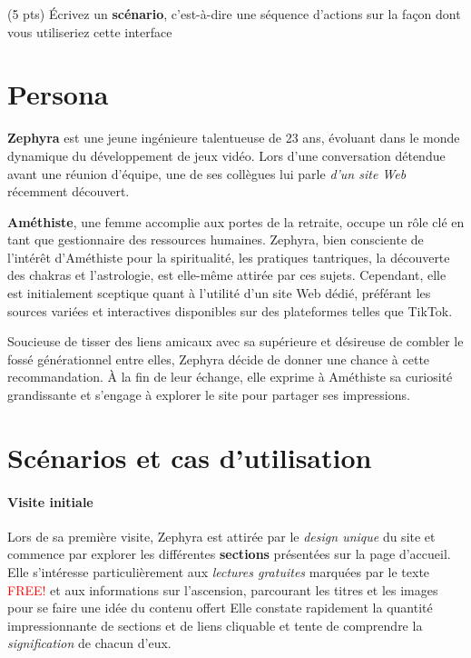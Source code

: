 \documentclass[9pt]{report}
\newcommand{\mathpazott}{\fontfamily{pplj}\selectfont}
\renewcommand{\texttt}[1]{{\scriptsize\mathpazott #1}}
\begin{document}
\begin{multicols*}{2}
  \begin{Exercice}{(5 pts)}{}
    Écrivez un \textbf{scénario}, c’est-à-dire une séquence d’actions sur 
    la façon dont vous utiliseriez cette
    interface
  \end{Exercice}


  \section{Persona}
  \textbf{Zephyra} est une jeune ingénieure talentueuse de 23 ans, 
  évoluant dans le monde dynamique du développement de jeux vidéo. 
  Lors d'une conversation détendue avant une réunion d'équipe, 
une de ses collègues lui parle \textit{d'un site Web} récemment découvert.

  \textbf{Améthiste}, une femme accomplie aux portes de la retraite, 
  occupe un rôle clé en tant que gestionnaire des ressources humaines. 
  Zephyra, bien consciente de l'intérêt d'Améthiste pour la spiritualité, 
  les pratiques tantriques, la découverte des chakras et l'astrologie, 
  est elle-même attirée par ces sujets. Cependant, elle est initialement 
  sceptique quant à l'utilité d'un site Web dédié, préférant les sources 
  variées et interactives disponibles sur des plateformes telles que 
  \texttt{TikTok}.

  Soucieuse de tisser des liens amicaux avec sa supérieure et désireuse 
  de combler le fossé générationnel entre elles, Zephyra décide de donner 
  une chance à cette recommandation. À la fin de leur échange, elle exprime 
  à Améthiste sa curiosité grandissante et s'engage à explorer le site 
  pour partager ses impressions.


  \section{Scénarios et cas d'utilisation} 

  \paragraph{Visite initiale}
  Lors de sa première visite, Zephyra est attirée par le 
  \textit{design unique} du 
  site et commence par explorer les différentes \textbf{sections}
  présentées sur la page d'accueil. Elle s'intéresse particulièrement 
  aux \textit{lectures gratuites} marquées par le texte 
  \textcolor{red}{\texttt{FREE!}} et aux informations sur l'ascension, 
  parcourant les titres et les images pour se faire une idée 
  du contenu offert Elle constate rapidement la quantité impressionnante 
  de sections et de liens cliquable et tente de comprendre 
  la \textit{signification} de chacun d'eux.



\end{multicols*}
\end{document}
